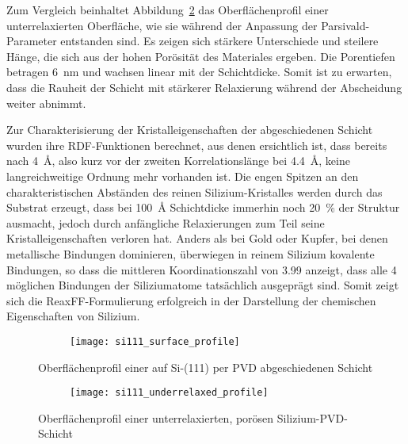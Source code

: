 Zum Vergleich beinhaltet Abbildung~\ref{fig:siliconunderrelaxedprofile} das Oberflächenprofil einer unterrelaxierten Oberfläche, wie sie während der Anpassung der Parsivald-Parameter entstanden sind.
Es zeigen sich stärkere Unterschiede und steilere Hänge, die sich aus der hohen Porösität des Materiales ergeben.
Die Porentiefen betragen \SI{6}{\nano\meter} und wachsen linear mit der Schichtdicke.
Somit ist zu erwarten, dass die Rauheit der Schicht mit stärkerer Relaxierung während der Abscheidung weiter abnimmt.

Zur Charakterisierung der Kristalleigenschaften der abgeschiedenen Schicht wurden ihre RDF-Funktionen berechnet, aus denen ersichtlich ist, dass bereits nach \SI{4}{\angstrom}, also kurz vor der zweiten Korrelationslänge bei \SI{4.4}{\angstrom}, keine langreichweitige Ordnung mehr vorhanden ist.
Die engen Spitzen an den charakteristischen Abständen des reinen Silizium-Kristalles werden durch das Substrat erzeugt, dass bei \SI{100}{\angstrom} Schichtdicke immerhin noch \SI{20}{\percent} der Struktur ausmacht, jedoch durch anfängliche Relaxierungen zum Teil seine Kristalleigenschaften verloren hat.
Anders als bei Gold oder Kupfer, bei denen metallische Bindungen dominieren, überwiegen in reinem Silizium kovalente Bindungen, so dass die mittleren Koordinationszahl von \num{3.99} anzeigt, dass alle 4 möglichen Bindungen der Siliziumatome tatsächlich ausgeprägt sind.
Somit zeigt sich die ReaxFF-Formulierung erfolgreich in der Darstellung der chemischen Eigenschaften von Silizium.

\begin{figure}[H]
  \centering
  \captionsetup[subfigure]{singlelinecheck=false}
  \begin{subfigure}[t]{7.1cm}
    \texttt{[image: si111\_surface\_profile]}
  \end{subfigure}
  \begin{subfigure}[t]{1.7cm}
    \def\svgwidth{\textwidth}
    
  \end{subfigure}
  \caption[Oberflächenprofil einer Silizium-PVD-Schicht]{
    Oberflächenprofil einer auf Si-(111) per PVD abgeschiedenen Schicht
  }
  \label{fig:siliconprofile}
\end{figure}

\begin{figure}[H]
  \centering
  \captionsetup[subfigure]{singlelinecheck=false}
  \begin{subfigure}[t]{7.1cm}
    \texttt{[image: si111\_underrelaxed\_profile]}
  \end{subfigure}
  \begin{subfigure}[t]{1.7cm}
    \def\svgwidth{\textwidth}
    
  \end{subfigure}
  \caption[Oberflächenprofil einer unterrelaxierten Siliziumschicht]{
    Oberflächenprofil einer unterrelaxierten, porösen Silizium-PVD-Schicht
  }
  \label{fig:siliconunderrelaxedprofile}
\end{figure}

